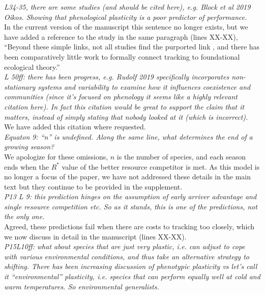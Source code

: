 \documentclass[11pt]{article}
\begin{document}
\emph{L34-35, there are some studies (and should be cited here), e.g. Block et al 2019 Oikos.
Showing that phenological plasticity is a poor predictor of performance.}\\

In the current version of the manuscript this sentence no longer exists, but we have added a reference to the study in the same paragraph (lines XX-XX), ``Beyond these simple links, not all studies find the purported link \citep{block2019}, and there has been comparatively little work to formally connect tracking to foundational ecological theory.''\\

\emph{L 50ff: there has been progress, e.g. Rudolf 2019 specifically incorporates non-stationary
systems and variability to examine how it influences coexistence and communities (since it’s
focused on phenology it seems like a highly relevant citation here). In fact this citation
would be great to support the claim that it matters, instead of simply stating that nobody
looked at it (which is incorrect).}\\

We have added this citation where requested.\\

\emph{Equaton 9: ``n'' is undefined. Along the same line, what determines the end of a growing
season?}\\

We apologize for these omissions, $n$ is the number of species, and each season ends when the $R^*$ value of the better resource competitor is met. As this model is no longer a focus of the paper, we have not addressed these details in the main text but they continue to be provided in the supplement.\\

\emph{P13 L 9: this prediction hinges on the assumption of early arriver advantage and single
resource competition etc. So as it stands, this is one of the predictions, not the only one.}\\

Agreed, these predictions fail when there are costs to tracking too closely, which we now discuss in detail in the manuscript (lines XX-XX).\\

\emph{P15L10ff: what about species that are just very plastic, i.e. can adjust to cope with various
environmental conditions, and thus take an alternative strategy to shifting. There has been
increasing discussion of phenotypic plasticity vs let’s call it ``environmental''  plasticity,
i.e. species that can perform equally well at cold and warm temperatures. So environmental
generalists.}\\
\end{document}
